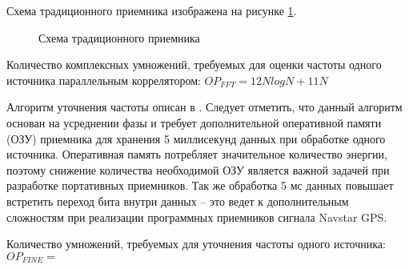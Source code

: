 Схема традиционного приемника изображена на рисунке \ref{pic:corr_scheme}.
\begin{figure}[H]
	\center{}
	\caption{Схема традиционного приемника}
	\label{pic:corr_scheme}
\end{figure}

Количество комплексных умножений, требуемых для оценки частоты одного источника параллельным коррелятором: ${OP_{FFT} = 12NlogN + 11N}$

Алгоритм уточнения частоты описан в \cite{tsui}. Следует отметить, что данный алгоритм основан на усреднении фазы и требует дополнительной оперативной памяти
(ОЗУ) приемника для хранения 5 миллисекунд данных при обработке одного источника. Оперативная память потребляет значительное количество энергии,
поэтому снижение количества необходимой ОЗУ является важной задачей при разработке портативных приемников.
Так же обработка 5 мс данных повышает встретить переход бита внутри данных – это ведет к дополнительным сложностям при реализации программных приемников сигнала Navstar GPS.

Количество умножений, требуемых для уточнения частоты одного источника: ${OP_{FINE} = }$

\newpage
